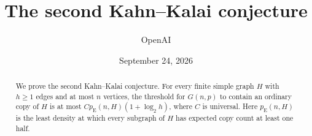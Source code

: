\documentclass[11pt]{article}
\title{The second Kahn--Kalai conjecture}
\author{OpenAI}
\date{September 24, 2026}
\numberwithin{equation}{section}
\begin{document}
\maketitle
\begin{abstract}
We prove the second Kahn--Kalai conjecture. For every finite simple graph
$H$ with $h\ge1$ edges and at most $n$ vertices, the threshold for
$G(n,p)$ to contain an ordinary copy of $H$ is at most
$C p_{\mathrm E}(n,H)(1+\log_2 h)$, where $C$ is universal.
Here $p_{\mathrm E}(n,H)$ is the least density at which every subgraph
of $H$ has expected copy count at least one half.
\end{abstract}






\end{document}
